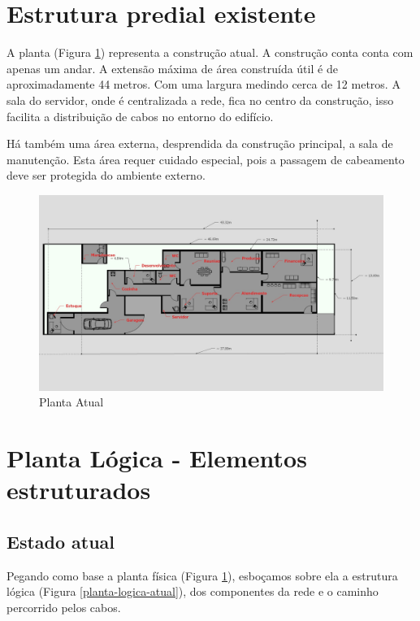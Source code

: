 \documentclass[	DIV=calc,%
							paper=a4,%
							fontsize=12pt,%
							onecolumn]{scrartcl}	 					%
\begin{document}
\section{Estrutura predial existente}

A planta (Figura \ref{planta-atual}) representa a construção atual. A construção conta conta com apenas um andar. A extensão máxima de área construída útil é de aproximadamente 44 metros. Com uma largura medindo cerca de 12 metros. A sala do servidor, onde é centralizada a rede, fica no centro da construção, isso facilita a distribuição de cabos no entorno do edifício.

Há também uma área externa, desprendida da construção principal, a sala de manutenção. Esta área requer cuidado especial, pois a passagem de cabeamento deve ser protegida do ambiente externo.

\begin{figure}[H]
	\centering
	\includegraphics[width=\textwidth]{planta-atual}
	\caption{Planta Atual}
	\label{planta-atual}
\end{figure}

\section{Planta Lógica - Elementos estruturados}

\subsection{Estado atual}
Pegando como base a planta física (Figura \ref{planta-atual}), esboçamos sobre ela a estrutura lógica (Figura \ref{planta-logica-atual}), dos componentes da rede e o caminho percorrido pelos cabos.
\end{document}
